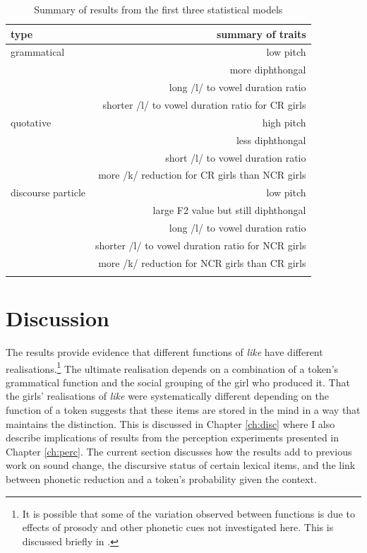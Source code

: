   
\begin{table}
\begin{center}
\begin{tabular}{lr}
  \lsptoprule
 type & summary of traits \\
 \midrule
 
 grammatical & low pitch   \\
             & more diphthongal \\
             & long /l/ to vowel duration ratio \\
             & shorter /l/ to vowel duration ratio for CR girls \\
             
             \midrule
 quotative   & high pitch \\
             & less diphthongal \\
             & short /l/ to vowel duration ratio \\
             & more /k/ reduction for CR girls than NCR girls \\
             \midrule
             
 discourse particle & low pitch \\
        		 & large F2 value but still diphthongal \\
             & long /l/ to vowel duration ratio \\
             & shorter /l/ to vowel duration ratio for NCR girls \\
             & more /k/ reduction for NCR girls than CR girls \\
  \lspbottomrule

\end{tabular}
\caption{Summary of results from the first three statistical models}
\label{tab:sumprodresults}
\end{center}
\end{table}


\section{Discussion}\label{sec:proddisc}

The results provide evidence that different functions of \textit{like} have different realisations.\footnote{It is possible that some of the variation observed between functions is due to effects of prosody and other phonetic cues not investigated here. This is discussed briefly in .} The ultimate realisation depends on a combination of a token's grammatical function and the social grouping of the girl who produced it. That the girls' realisations of \textit{like} were systematically different depending on the function of a token suggests that these items are stored in the mind in a way that maintains the distinction. This is discussed in Chapter \ref{ch:disc} where I also describe implications of results from the perception experiments presented in Chapter \ref{ch:perc}. The current section discusses how the results add to previous work on sound change, the discursive status of certain lexical items, and the link between phonetic reduction and a token's probability given the context. 
% 


